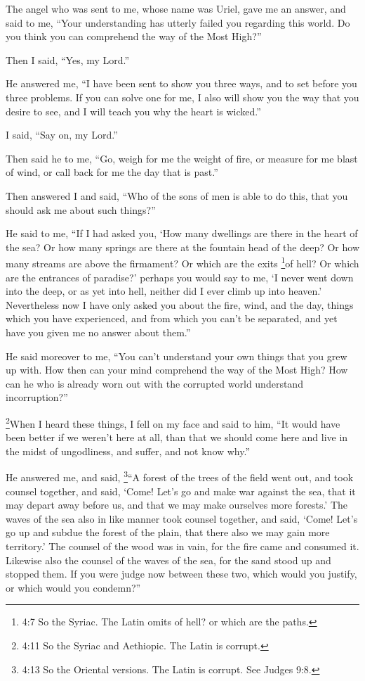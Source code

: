  The angel who was sent to me, whose name was Uriel, gave me
an answer,  and said to me, ``Your understanding has utterly
failed you regarding this world. Do you think you can comprehend the way
of the Most High?''

 Then I said, ``Yes, my Lord.''

He answered me, ``I have been sent to show you three ways, and to set
before you three problems.  If you can solve one for me, I
also will show you the way that you desire to see, and I will teach you
why the heart is wicked.''

 I said, ``Say on, my Lord.''

Then said he to me, ``Go, weigh for me the weight of fire, or measure
for me blast of wind, or call back for me the day that is past.''

 Then answered I and said, ``Who of the sons of men is able
to do this, that you should ask me about such things?''

 He said to me, ``If I had asked you, `How many dwellings
are there in the heart of the sea? Or how many springs are there at the
fountain head of the deep? Or how many streams are above the firmament?
Or which are the exits \footnote{4:7 So the Syriac. The Latin omits of
  hell? or which are the paths.}of hell? Or which are the entrances of
paradise?'  perhaps you would say to me, `I never went down
into the deep, or as yet into hell, neither did I ever climb up into
heaven.'  Nevertheless now I have only asked you about the
fire, wind, and the day, things which you have experienced, and from
which you can't be separated, and yet have you given me no answer about
them.''

 He said moreover to me, ``You can't understand your own
things that you grew up with.  How then can your mind
comprehend the way of the Most High? How can he who is already worn out
with the corrupted world understand incorruption?''

\footnote{4:11 So the Syriac and Aethiopic. The Latin is corrupt.}When I
heard these things, I fell on my face  and said to him,
``It would have been better if we weren't here at all, than that we
should come here and live in the midst of ungodliness, and suffer, and
not know why.''

 He answered me, and said, \footnote{4:13 So the Oriental
  versions. The Latin is corrupt. See Judges 9:8.}``A forest of the
trees of the field went out, and took counsel together, 
and said, `Come! Let's go and make war against the sea, that it may
depart away before us, and that we may make ourselves more forests.'
 The waves of the sea also in like manner took counsel
together, and said, `Come! Let's go up and subdue the forest of the
plain, that there also we may gain more territory.'  The
counsel of the wood was in vain, for the fire came and consumed it.
 Likewise also the counsel of the waves of the sea, for the
sand stood up and stopped them.  If you were judge now
between these two, which would you justify, or which would you
condemn?''


